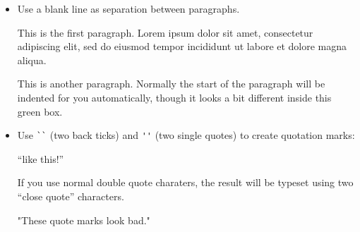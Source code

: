 \documentclass{article}
\begin{document}
\begin{itemize}
\item Use a blank line as separation between paragraphs.
\begin{good}
This is the first paragraph.  Lorem ipsum dolor sit amet,
consectetur adipiscing elit, sed do eiusmod tempor
incididunt ut labore et dolore magna aliqua.

This is another paragraph.  Normally the start of the
paragraph will be indented for you automatically, though
it looks a bit different inside this green box.
\end{good}
\item Use \verb|``| (two back ticks) and \verb|''| (two single quotes)
  to create quotation marks:
\begin{good}
``like this!''
\end{good}
If you use normal double quote charaters, the result will be typeset
using two ``close quote'' characters.
\begin{bad}
"These quote marks look bad."
\end{bad}


\end{itemize}
\end{document}
